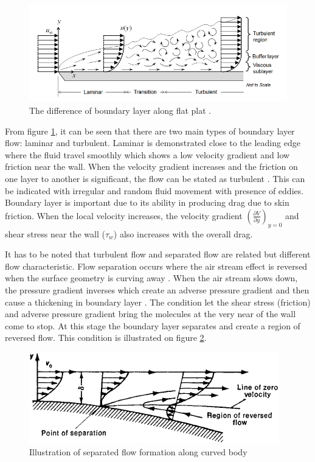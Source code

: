 \begin{figure}[!ht]
    \centering
    \includegraphics[scale=0.7]{Figures/BL_laminar_turbulent.png}
    \caption{The difference of boundary layer along flat plat \cite{Frei2017WhichApplication}.}
    \label{fig:3}
\end{figure}

\noindent From figure \ref{fig:3}, it can be seen that there are two main types of boundary layer flow: laminar and turbulent. Laminar is demonstrated close to the leading edge where the fluid travel smoothly which shows a low velocity gradient and low friction near the wall. When the velocity gradient increases and the friction on one layer to another is significant, the flow can be stated as turbulent \cite{Scibor-Rylski1984RoadAerodynamics}. This can be indicated with irregular and random fluid movement with presence of eddies. Boundary layer is important due to its ability in producing drag due to skin friction. When the local velocity increases, the velocity gradient $(\frac{\partial V}{\partial y})_{y=0} $ and shear stress near the wall ($\tau_w $) also increases with the overall drag.

\noindent It has to be noted that turbulent flow and separated flow are related but different flow characteristic. Flow separation occurs where the air stream effect is reversed when the surface geometry is curving away . When the air stream slows down, the pressure gradient inverses which create an adverse pressure gradient and then cause a thickening in boundary layer \cite{Scibor-Rylski1984RoadAerodynamics}. The condition let the shear stress (friction) and adverse pressure gradient bring the molecules at the very near of the wall come to stop. At this stage the boundary layer separates  and create a region of reversed flow. This condition is illustrated on figure \ref{fig:flow separation}.

\begin{figure}[!ht]
    \centering
    \includegraphics[scale= 0.8]{Figures/flow_separation.png}
    \caption{Illustration of separated flow formation along curved body \cite{Anonymous1979SeparationDictionary}}
    \label{fig:flow separation}
\end{figure}


